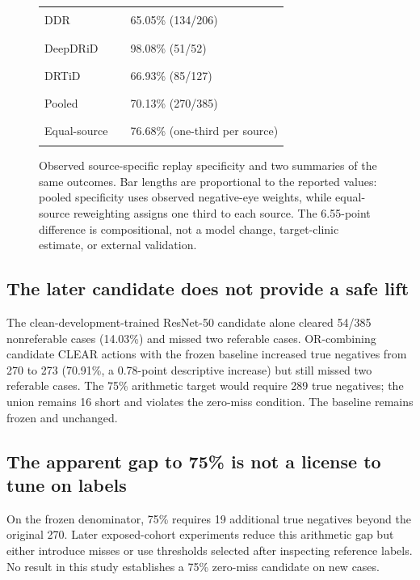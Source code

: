 \documentclass[11pt]{article}
\begin{document}
\begin{figure}[t]
\centering
\small
\setlength{\tabcolsep}{3pt}
\begin{tabular}{lrl}
DDR & \textcolor{blue}{\rule{39.0mm}{2.4mm}} & 65.05\% (134/206)\\[2pt]
DeepDRiD & \textcolor{blue}{\rule{58.8mm}{2.4mm}} & 98.08\% (51/52)\\[2pt]
DRTiD & \textcolor{blue}{\rule{40.2mm}{2.4mm}} & 66.93\% (85/127)\\[2pt]
Pooled & \textcolor{black}{\rule{42.1mm}{2.4mm}} & 70.13\% (270/385)\\[2pt]
Equal-source & \textcolor{orange}{\rule{46.0mm}{2.4mm}} & 76.68\% (one-third per source)
\end{tabular}
\caption{Observed source-specific replay specificity and two summaries of the same outcomes. Bar lengths are proportional to the reported values: pooled specificity uses observed negative-eye weights, while equal-source reweighting assigns one third to each source. The 6.55-point difference is compositional, not a model change, target-clinic estimate, or external validation.}
\label{fig:source}
\end{figure}

\subsection{The later candidate does not provide a safe lift}
The clean-development-trained ResNet-50 candidate alone cleared 54/385 nonreferable cases (14.03\%) and missed two referable cases. OR-combining candidate CLEAR actions with the frozen baseline increased true negatives from 270 to 273 (70.91\%, a 0.78-point descriptive increase) but still missed two referable cases. The 75\% arithmetic target would require 289 true negatives; the union remains 16 short and violates the zero-miss condition. The baseline remains frozen and unchanged.

\subsection{The apparent gap to 75\% is not a license to tune on labels}
On the frozen denominator, 75\% requires 19 additional true negatives beyond the original 270. Later exposed-cohort experiments reduce this arithmetic gap but either introduce misses or use thresholds selected after inspecting reference labels. No result in this study establishes a 75\% zero-miss candidate on new cases.
\end{document}
